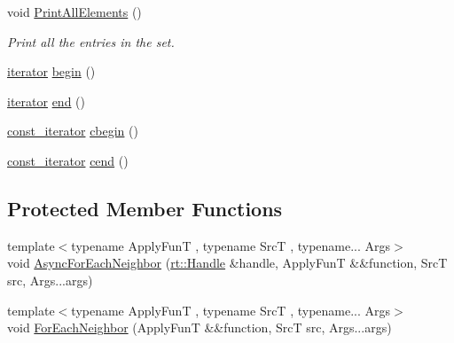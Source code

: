 \begin{DoxyCompactItemize}
void \hyperlink{classshad_1_1LocalSet_a81d5e14f5673441a23499b0c6935d5f3}{Print\-All\-Elements} ()
\begin{DoxyCompactList}\small\item\em Print all the entries in the set. \end{DoxyCompactList}\item 
\hyperlink{classshad_1_1LocalSet_a90ad05d816b6336fea56e6511093d4f6}{iterator} \hyperlink{classshad_1_1LocalSet_a5a65d59343c4636fef46da660b2a7eb6}{begin} ()
\item 
\hyperlink{classshad_1_1LocalSet_a90ad05d816b6336fea56e6511093d4f6}{iterator} \hyperlink{classshad_1_1LocalSet_a53dc0f1dc7b515f9cf555e781a933bd2}{end} ()
\item 
\hyperlink{classshad_1_1LocalSet_a3a1104a2552f91dcdf37b057440ba182}{const\-\_\-iterator} \hyperlink{classshad_1_1LocalSet_a695b93811d46a8022840ee42ed91b6e5}{cbegin} ()
\item 
\hyperlink{classshad_1_1LocalSet_a3a1104a2552f91dcdf37b057440ba182}{const\-\_\-iterator} \hyperlink{classshad_1_1LocalSet_a09f7a121d6f471e9ab780885af3dd000}{cend} ()
\end{DoxyCompactItemize}
\subsection*{Protected Member Functions}
\begin{DoxyCompactItemize}
\item 
{\footnotesize template$<$typename Apply\-Fun\-T , typename Src\-T , typename... Args$>$ }\\void \hyperlink{classshad_1_1LocalSet_a482dc96490e50af9910889454537c236}{Async\-For\-Each\-Neighbor} (\hyperlink{classshad_1_1rt_1_1Handle}{rt\-::\-Handle} \&handle, Apply\-Fun\-T \&\&function, Src\-T src, Args...\-args)
\item 
{\footnotesize template$<$typename Apply\-Fun\-T , typename Src\-T , typename... Args$>$ }\\void \hyperlink{classshad_1_1LocalSet_a2b9339aab76b1cfa1a31e6f68efc93b6}{For\-Each\-Neighbor} (Apply\-Fun\-T \&\&function, Src\-T src, Args...\-args)
\end{DoxyCompactItemize}
